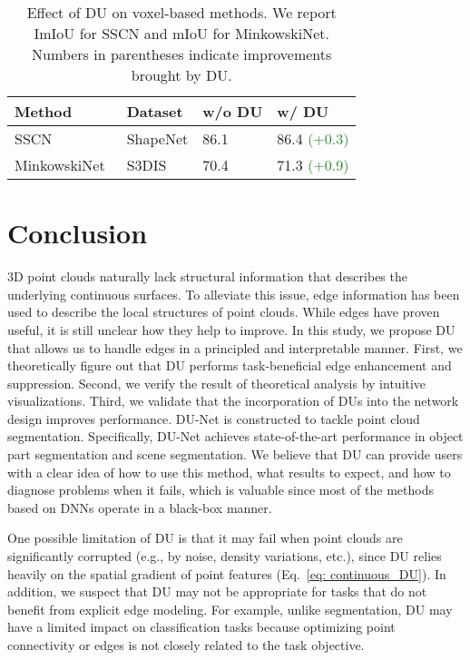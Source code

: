 \documentclass[a4paper,fleqn]{cas-dc}
\begin{document}
\begin{table}[t]
    \centering
    \caption{Effect of DU on voxel-based methods. We report ImIoU for SSCN and mIoU for MinkowskiNet. Numbers in parentheses indicate improvements brought by DU.}
\begin{tabular*}{\tblwidth}{LLLL}
         \toprule
         Method
         & Dataset 
         & w/o DU
         & w/ DU
         \\
         \midrule
         SSCN~\cite{graham20183d}
         & ShapeNet
         & 86.1
         & 86.4 \textcolor{ForestGreen}{(+0.3)}
         \\
         MinkowskiNet~\cite{choy20194d}
         & S3DIS
         & 70.4
         & 71.3 \textcolor{ForestGreen}{(+0.9)}
         \\
         \bottomrule
    \end{tabular*}
    \label{tab: effect on voxel-based methods}
\end{table}

\section{Conclusion}
\label{sec:conclusion}
3D point clouds naturally lack structural information that describes the underlying continuous surfaces. To alleviate this issue, edge information has been used to describe the local structures of point clouds. While edges have proven useful, it is still unclear how they help to improve. In this study, we propose DU that allows us to handle edges in a principled and interpretable manner.
First, we theoretically figure out that DU performs task-beneficial edge enhancement and suppression. Second, we verify the result of theoretical analysis by intuitive visualizations. Third, we validate that the incorporation of DUs into the network design improves performance. 
DU-Net is constructed to tackle point cloud segmentation. Specifically, DU-Net achieves state-of-the-art performance in object part segmentation and scene segmentation. 
We believe that DU can provide users with a clear idea of how to use this method, what results to expect, and how to diagnose problems when it fails, which is valuable since most of the methods based on DNNs operate in a black-box manner. 

One possible limitation of DU is that it may fail when point clouds are significantly corrupted (e.g., by noise, density variations, etc.), since DU relies heavily on the spatial gradient of point features (Eq.~\eqref{eq: continuous_DU}). In addition, we suspect that DU may not be appropriate for tasks that do not benefit from explicit edge modeling. For example, unlike segmentation, DU may have a limited impact on classification tasks because optimizing point connectivity or edges is not closely related to the task objective.
\end{document}
